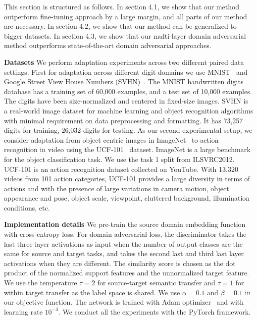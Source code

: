 This section is structured as follows. In section 4.1, we show that our method outperform fine-tuning approach by a large margin, and all parts of our method are necessary. In section 4.2, we show that our method can be generalized to bigger datasets. In section 4.3, we show that our multi-layer domain adversarial method outperforms state-of-the-art domain adversarial approaches.

\textbf{Datasets} We perform adaptation experiments across two different paired data settings. First for adaptation across different digit domains we use MNIST~\cite{lecun1998gradient} and Google Street View House Numbers (SVHN)~\cite{netzer2011reading}. The MNIST handwritten digits database has a training set of 60,000 examples, and a test set of 10,000 examples. The digits have been size-normalized and centered in fixed-size images.
SVHN is a real-world image dataset for machine learning and object recognition algorithms with minimal requirement on data preprocessing and formatting. It has 73,257 digits for training, 26,032 digits for testing.
As our second experimental setup, we consider adaptation from object centric images in ImageNet~\cite{russakovsky2015imagenet} to action recognition in video using the UCF-101~\cite{soomro2012ucf101} dataset.
ImageNet is a large benchmark for the object classification task. We use the task 1 split from ILSVRC2012.
UCF-101 is an action recognition dataset collected on YouTube. With 13,320 videos from 101 action categories, UCF-101 provides a large diversity in terms of actions and with the presence of large variations in camera motion, object appearance and pose, object scale, viewpoint, cluttered background, illumination conditions, etc.

\textbf{Implementation details}
We pre-train the source domain embedding function with  cross-entropy loss. For domain adversarial loss, the discriminator takes the last three layer activations as input when the number of output classes are the same for source and target tasks, and takes the second last and third last layer activations when they are different. The similarity score is chosen as the dot product of the normalized support features and the unnormalized target feature. We use the temperature $\tau=2$ for source-target semantic transfer and $\tau=1$ for within target transfer as the label space is shared. We use $\alpha=0.1$ and $\beta=0.1$ in our objective function. The network is trained with Adam optimizer~\cite{kingma2014adam} and with learning rate $10^{-3}$. We conduct all the experiments with the PyTorch framework.


